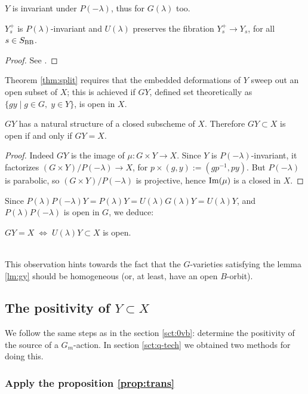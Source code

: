 \documentclass[11pt,reqno]{amsart}
\newenvironment{m-remark}{\vskip5pt\refstepcounter{stff}\trivlist \itemindent 0pt
\item[\hskip\labelsep\bf Remark~\thestff]\ignorespaces}{\endtrivlist\vskip5pt}
\let\nit\noindent
\numberwithin{equation}{section}
\numberwithin{figure}{section}
\let\l\lambda
\begin{document}
\begin{m-lemma}\label{lm:y-invar}
\nit{\rm(i)} $Y$ is invariant under $P(-\l)$, thus for $G(\l)$ too. 

\nit{\rm(ii)} $Y_s^+$ is $P(\l)$-invariant and $U(\l)$ preserves the fibration 
$Y_s^+\to Y_s$, for all $s\in S_{{\rm BB}}$. 
\end{m-lemma}

\begin{proof} 
See \cite{hal+taj}. 
\end{proof}

Theorem \ref{thm:split} requires that the embedded deformations of $Y$ sweep out 
an open subset of $X$; 
this is achieved if $GY$, defined set theoretically as $\{gy\mid g\in G,\;y\in Y\}$, 
is open in $X$. 

\begin{m-lemma}\label{lm:gy}
$GY$ has a natural structure of a closed subscheme of $X$. 
Therefore $GY\subset X$ is open if and only if $GY=X$. 
\end{m-lemma}

\begin{proof}
Indeed $GY$ is the image of $\mu:G\times Y\to X$. 
Since $Y$ is $P(-\l)$-invariant, it factorizes 
$(G\times Y)/P(-\l)\to X$, for $p\times(g,y):=(gp^{-1},py)$. 
But $P(-\l)$ is parabolic, so $(G\times Y)/P(-\l)$ is projective, 
hence ${{\rm Im}}(\mu)$ is a closed in $X$. 
\end{proof}

\begin{m-remark}\label{rmk:open}
Since $P(\l)P(-\l)Y=P(\l)Y=U(\l)G(\l)Y=U(\l)Y$, and  
$P(\l)P(-\l)$ is open in $G$, we deduce: 
\\ \centerline{
$GY=X\;\Leftrightarrow\;U(\l)Y\subset X$ is open. 
}\\[.5ex]
This observation hints towards the fact that the $G$-varieties satisfying the 
lemma \ref{lm:gy} should be homogeneous (or, at least, have an open $B$-orbit). 
\end{m-remark}

\subsection{The positivity of $Y\subset X$}\label{ssct:posYX}

We follow the same steps as in the section \ref{sct:0vb}: determine the positivity 
of the source of a $G_m$-action. In section \ref{sct:q-tech} we obtained two methods 
for doing this.  

\subsubsection{Apply the proposition \ref{prop:trans}}\label{sssct:trans}
\end{document}
